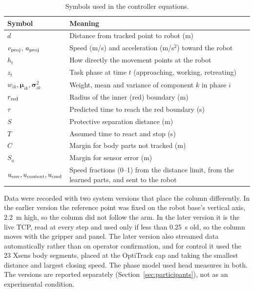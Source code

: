 \documentclass{IEEEtran}
\begin{document}
\begin{table}[!t]
\centering
\caption{Symbols used in the controller equations.}
\label{tab:notation}
\footnotesize
\begin{tabular}{@{}lp{5.1cm}@{}}
\toprule
Symbol & Meaning \\
\midrule
$d$ & Distance from tracked point to robot (m) \\
$v_{\rm proj}$, $a_{\rm proj}$ & Speed (m/s) and acceleration (m/s$^2$) toward the robot \\
$h_t$ & How directly the movement points at the robot \\
$z_t$ & Task phase at time $t$ (approaching, working, retreating) \\
$w_{ik},\boldsymbol\mu_{ik},\boldsymbol\sigma^2_{ik}$ & Weight, mean and variance of component $k$ in phase $i$ \\
$r_{\rm red}$ & Radius of the inner (red) boundary (m) \\
$\tau$ & Predicted time to reach the red boundary (s) \\
$S$ & Protective separation distance (m) \\
$T$ & Assumed time to react and stop (s) \\
$C$ & Margin for body parts not tracked (m) \\
$S_a$ & Margin for sensor error (m) \\
$u_{\rm env},u_{\rm context},u_{\rm cmd}$ & Speed fractions (0--1) from the distance limit, from the learned parts, and sent to the robot \\
\bottomrule
\end{tabular}
\end{table}

Data were recorded with two system versions that place the column
differently. In the earlier version the reference point was fixed on the
robot base's vertical axis, 2.2~m high, so the column did not follow the arm.
In the later version it is the live TCP, read at every step and used only if
less than 0.25~s old, so the column moves with the gripper and panel. The later
version also streamed data automatically rather than on operator
confirmation, and for control it used the 23 Xsens body segments, placed at the
OptiTrack cap and taking the smallest distance and largest closing speed. The
phase model used head measures in both. The versions are reported separately
(Section~\ref{sec:participants}), not as an experimental condition.
\end{document}
